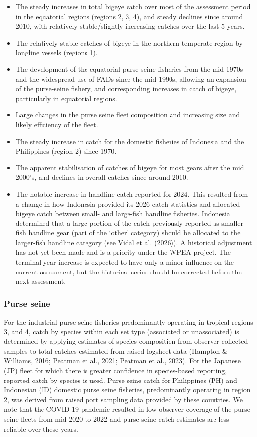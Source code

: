 \documentclass[
  english,
  a4paper,
  a4paper,
  11pt]{SCreport}
\begin{document}
\begin{itemize}
\item
  The steady increases in total bigeye catch over most of the assessment
  period in the equatorial regions (regions 2, 3, 4), and steady
  declines since around 2010, with relatively stable/slightly increasing
  catches over the last 5 years.
\item
  The relatively stable catches of bigeye in the northern temperate
  region by longline vessels (regions 1).
\item
  The development of the equatorial purse-seine fisheries from the
  mid-1970s and the widespread use of FADs since the mid-1990s, allowing
  an expansion of the purse-seine fishery, and corresponding increases
  in catch of bigeye, particularly in equatorial regions.
\item
  Large changes in the purse seine fleet composition and increasing size
  and likely efficiency of the fleet.
\item
  The steady increase in catch for the domestic fisheries of Indonesia
  and the Philippines (region 2) since 1970.
\item
  The apparent stabilisation of catches of bigeye for most gears after
  the mid 2000's, and declines in overall catches since around 2010.
\item
  The notable increase in handline catch reported for 2024. This
  resulted from a change in how Indonesia provided its 2026 catch
  statistics and allocated bigeye catch between small- and large-fish
  handline fisheries. Indonesia determined that a large portion of the
  catch previously reported as smaller-fish handline gear (part of the
  `other' category) should be allocated to the larger-fish handline
  category (see Vidal et al. (2026)). A historical adjustment has not
  yet been made and is a priority under the WPEA project. The
  terminal-year increase is expected to have only a minor influence on
  the current assessment, but the historical series should be corrected
  before the next assessment.
\end{itemize}

\subsubsection{Purse seine}\label{sec-catch-effort-PS}

For the industrial purse seine fisheries predominantly operating in
tropical regions 3, and 4, catch by species within each set type
(associated or unassociated) is determined by applying estimates of
species composition from observer-collected samples to total catches
estimated from raised logsheet data (Hampton \& Williams, 2016; Peatman
et al., 2021; Peatman et al., 2023). For the Japanese (JP) fleet for
which there is greater confidence in species-based reporting, reported
catch by species is used. Purse seine catch for Philippines (PH) and
Indonesian (ID) domestic purse seine fisheries, predominantly operating
in region 2, was derived from raised port sampling data provided by
these countries. We note that the COVID-19 pandemic resulted in low
observer coverage of the purse seine fleets from mid 2020 to 2022 and
purse seine catch estimates are less reliable over these years.
\end{document}

